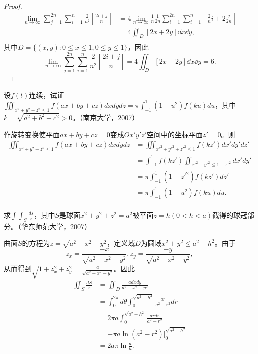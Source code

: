\begin{proof}
  \begin{align*}
  \lim_{n\rightarrow\infty}\sum_{j=1}^{2n}\sum_{i=1}^n\frac{2}{n^2}[\frac{2i+j}{n}]&=4\lim_{n\rightarrow\infty}\frac{1}{n}\frac{1}{2n}\sum_{i=1}^{2n}\sum_{i=1}^n[\frac{2}{n}i+2\frac{j}{2n}]\\
  &=4\iint_D[2x+2y]\dd x\dd y,\\
  \end{align*}
  其中$D=\{(x,y):0\leq x\leq1,0\leq y\leq1\}$，因此
  $$\lim_{n\rightarrow\infty}\sum_{j=1}^{2n}\sum_{i=1}^n\frac{2}{n^2}[\frac{2i+j}{n}]=4\iint_D[2x+2y]\dd x\dd y=6.$$
  \end{proof}
  
\begin{exercise}
   设$f(t)$连续，试证$\displaystyle\iiint_{x^2+y^2+z^2\leq1}f(ax+by+cz)dxdydz=\pi\int_{-1}^1(1-u^2)f(ku)du$，其中$k=\sqrt{a^2+b^2+c^2}>0$。（南京大学，2007） 
  
   作旋转变换使平面$ax+by+cz=0$变成$Ox'y'z'$空间中的坐标平面$z'=0$。则
  \begin{align*}
  \iiint_{x^2+y^2+z^2\leq 1}f(ax+by+cz)dxdydz&=\iiint_{x'^2+y'^2+z'^2\leq1}f(kz')dx'dy'dz'\\
  &=\int_{-1}^1f(kz')\iint_{x'^2+y'^2\leq1-z'^2}dx'dy'\\
  &=\pi\int_{-1}^1(1-z'^2)f(kz')dz'\\
  &=\pi\int_{-1}^1(1-u^2)f(ku)du.\\
  \end{align*} 
  \end{exercise}
  
  \begin{exercise}
  求$\int\int_S\frac{ds}z$，其中$S$是球面$x^2+y^2+z^2=a^2$被平面$z=h(0<h<a)$截得的球冠部分。（华东师范大学，2007）  
  
   曲面$S$的方程为$z=\sqrt{a^2-x^2-y^2}$，定义域$D$为圆域$x^2+y^2\leq a^2-h^2$。由于$$z_x=\frac{-x}{\sqrt{a^2-x^2-y^2}},z_y=\frac{-y}{\sqrt{a^2-x^2-y^2}},$$
  从而得到$\sqrt{1+z_x^2+z_y^2}=\frac{a}{\sqrt{a^2-x^2-y^2}}$。因此
  \begin{align*}
  \iint_S\frac{dS}{z}&=\iint_D\frac{adxdy}{a^2-x^2-y^2}\\
  &=\int_0^{2\pi}d\theta\int_0^{\sqrt{a^2-h^2}}\frac{ar}{a^2-r^2}dr\\
  &=2\pi a\int_0^{\sqrt{a^2-h^2}}\frac{ardr}{a^2-r^2}\\
  &=-\pi a\ln(a^2-r^2)|_0^{\sqrt{a^2-h^2}}\\
  &=2a\pi\ln\frac{a}{h}.\\
  \end{align*} 
  \end{exercise}
  
